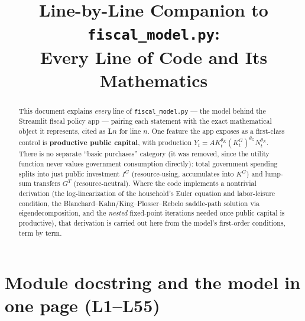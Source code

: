 \documentclass[11pt]{article}
\title{Line-by-Line Companion to \texttt{fiscal\_model.py}:\\
Every Line of Code and Its Mathematics}
\author{}
\date{}
\begin{document}
\maketitle

\begin{abstract}
\noindent This document explains \emph{every} line of \texttt{fiscal\_model.py}
--- the model behind the Streamlit fiscal policy app ---
pairing each statement with the exact mathematical object it represents,
cited as \textbf{L}$n$ for line $n$. One feature the app exposes as a first-class control is
\textbf{productive public capital}, with
production $Y_t=AK_t^{\theta_K}(K^G_t)^{\theta_G}N_t^{\theta_N}$. There is no
separate ``basic purchases'' category (it was removed, since the utility
function never values government consumption directly): total government
spending splits into just public investment $I^G$ (resource-using,
accumulates into $K^G$) and lump-sum transfers $G^T$ (resource-neutral).
Where the code implements a nontrivial derivation (the log-linearization of
the household's Euler equation and labor-leisure condition, the
Blanchard--Kahn/King--Plosser--Rebelo saddle-path solution via
eigendecomposition, and the \emph{nested} fixed-point iterations needed once
public capital is productive), that derivation is carried out here from the
model's first-order conditions, term by term.
\end{abstract}

\tableofcontents

\section{Module docstring and the model in one page (L1--L55)}
\end{document}
